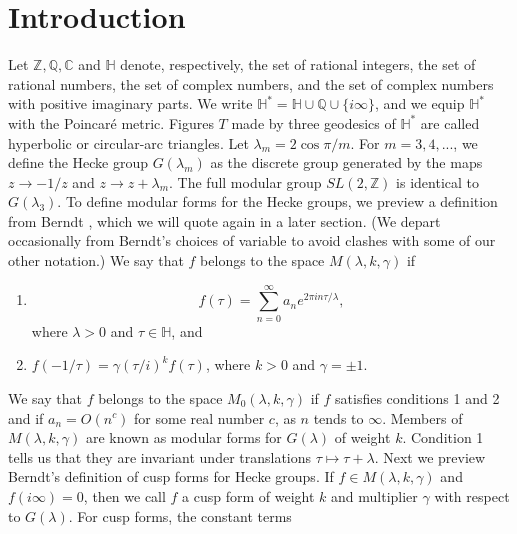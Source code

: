 \documentclass{article}
\begin{document}
\section{Introduction}
Let $\mathbb{Z}, \mathbb{Q}, 
\mathbb{C}$ and $\mathbb{H}$ 
denote, respectively, the set of rational integers,
the set of rational
numbers, the set  of 
complex numbers, and the set of
complex numbers
with positive imaginary parts. 
We write
$\mathbb{H}^* = \mathbb{H} \cup \mathbb{Q} \cup 
\{i \infty\}$, and we equip $\mathbb{H}^*$
with the Poincar{\'e} metric. Figures
$T$ made by three geodesics
of $\mathbb{H}^*$
are called hyperbolic or
circular-arc triangles.
Let $\lambda_m = 2 \cos \pi/m$.
For $m = 3, 4, ...$,
we define the Hecke group
$G(\lambda_m)$
as the discrete group generated by 
the maps $z \rightarrow -1/z$
and $ z \rightarrow z + \lambda_m$.
The full modular group $SL(2,\mathbb{Z})$
is identical to $G(\lambda_3)$.
\newline  \newline \noindent
To define modular forms for
the Hecke groups, we preview
a definition from Berndt  
\cite{berndt2008hecke}, 
which we will quote again
in a later section.
(We depart occasionally from Berndt's
choices of variable to avoid 
clashes with some of our other
notation.)
\newline \newline \noindent
We say that $f$ belongs to the space
$M(\lambda, k, \gamma)$ if
\begin{enumerate}
    \item 
    $$ f(\tau) = \sum_{n = 0}^{\infty}
    a_n e^{2 \pi i n \tau/\lambda},
    $$
    where $\lambda > 0$ and 
    $\tau \in \mathbb{H}$, and
    \item  $f(-1/\tau) = \gamma(\tau/i)^k f(\tau)$,
    where $k > 0$ and $\gamma = \pm 1$.
\end{enumerate}
We say that $f$ belongs to the space
$M_0(\lambda,k, \gamma)$ if $f$ satisfies conditions
1 and 2 and if $a_n = O(n^c)$
for some real number $c$, as $n$ tends to $\infty$.
\newline \newline \noindent
Members of $M(\lambda, k, \gamma)$
are known as modular forms for 
$G(\lambda)$ of weight $k$.
Condition 1 tells us that  they
are invariant under translations
$\tau \mapsto \tau + \lambda$.
Next we preview Berndt's definition
of cusp forms for Hecke groups.
If $f\in M(\lambda, k, \gamma)$
and $f(i \infty) = 0$,
then we call $f$ a cusp form of
weight $k$ and multiplier  $\gamma$
with respect to $G(\lambda)$. 
For cusp forms, the constant terms 
\end{document}
